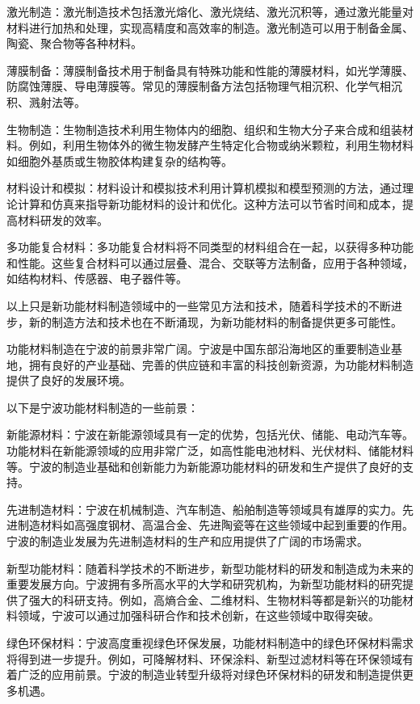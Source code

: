 激光制造：激光制造技术包括激光熔化、激光烧结、激光沉积等，通过激光能量对材料进行加热和处理，实现高精度和高效率的制造。激光制造可以用于制备金属、陶瓷、聚合物等各种材料。

薄膜制备：薄膜制备技术用于制备具有特殊功能和性能的薄膜材料，如光学薄膜、防腐蚀薄膜、导电薄膜等。常见的薄膜制备方法包括物理气相沉积、化学气相沉积、溅射法等。

生物制造：生物制造技术利用生物体内的细胞、组织和生物大分子来合成和组装材料。例如，利用生物体外的微生物发酵产生特定化合物或纳米颗粒，利用生物材料如细胞外基质或生物胶体构建复杂的结构等。

材料设计和模拟：材料设计和模拟技术利用计算机模拟和模型预测的方法，通过理论计算和仿真来指导新功能材料的设计和优化。这种方法可以节省时间和成本，提高材料研发的效率。

多功能复合材料：多功能复合材料将不同类型的材料组合在一起，以获得多种功能和性能。这些复合材料可以通过层叠、混合、交联等方法制备，应用于各种领域，如结构材料、传感器、电子器件等。

以上只是新功能材料制造领域中的一些常见方法和技术，随着科学技术的不断进步，新的制造方法和技术也在不断涌现，为新功能材料的制备提供更多可能性。



功能材料制造在宁波的前景非常广阔。宁波是中国东部沿海地区的重要制造业基地，拥有良好的产业基础、完善的供应链和丰富的科技创新资源，为功能材料制造提供了良好的发展环境。

以下是宁波功能材料制造的一些前景：

新能源材料：宁波在新能源领域具有一定的优势，包括光伏、储能、电动汽车等。功能材料在新能源领域的应用非常广泛，如高性能电池材料、光伏材料、储能材料等。宁波的制造业基础和创新能力为新能源功能材料的研发和生产提供了良好的支持。

先进制造材料：宁波在机械制造、汽车制造、船舶制造等领域具有雄厚的实力。先进制造材料如高强度钢材、高温合金、先进陶瓷等在这些领域中起到重要的作用。宁波的制造业发展为先进制造材料的生产和应用提供了广阔的市场需求。

新型功能材料：随着科学技术的不断进步，新型功能材料的研发和制造成为未来的重要发展方向。宁波拥有多所高水平的大学和研究机构，为新型功能材料的研究提供了强大的科研支持。例如，高熵合金、二维材料、生物材料等都是新兴的功能材料领域，宁波可以通过加强科研合作和技术创新，在这些领域中取得突破。

绿色环保材料：宁波高度重视绿色环保发展，功能材料制造中的绿色环保材料需求将得到进一步提升。例如，可降解材料、环保涂料、新型过滤材料等在环保领域有着广泛的应用前景。宁波的制造业转型升级将对绿色环保材料的研发和制造提供更多机遇。

